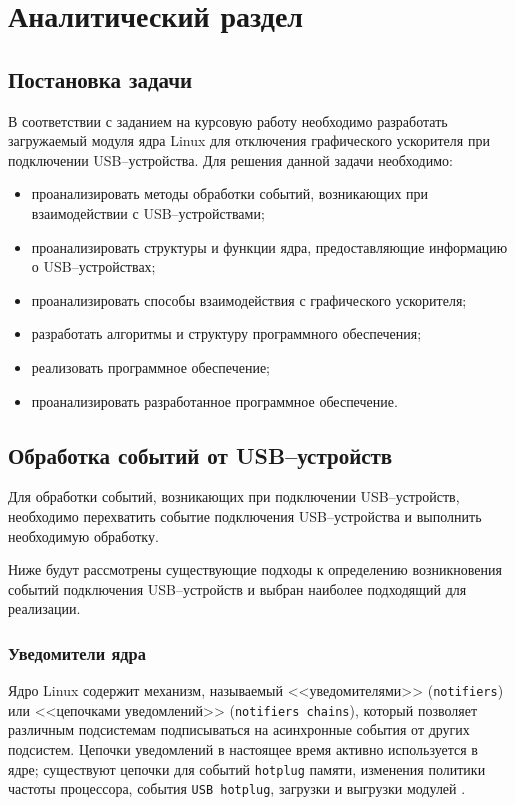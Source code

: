\chapter{Аналитический раздел}

\section{Постановка задачи}

В соответствии с заданием на курсовую работу необходимо разработать загружаемый модуля ядра Linux для отключения графического ускорителя при подключении USB--устройства. Для решения данной задачи необходимо:

\begin{itemize}
	\item проанализировать методы обработки событий, возникающих при взаимодействии с USB--устройствами;
	\item проанализировать структуры и функции ядра, предоставляющие информацию о USB--устройствах;
	\item проанализировать способы взаимодействия с графического ускорителя;
	\item разработать алгоритмы и структуру программного обеспечения;
	\item реализовать программное обеспечение;
	\item проанализировать разработанное программное обеспечение.
\end{itemize}

\section{Обработка событий от USB--устройств}

Для обработки событий, возникающих при подключении USB--устройств, необходимо перехватить событие подключения USB--устройства и выполнить необходимую обработку.

Ниже будут рассмотрены существующие подходы к определению возникновения событий подключения USB--устройств и выбран наиболее подходящий для реализации.

\newpage
\subsection{Уведомители ядра}

Ядро Linux содержит механизм, называемый <<уведомителями>> (\texttt{notifiers}) или <<цепочками уведомлений>> (\texttt{notifiers chains}), который позволяет различным подсистемам подписываться на асинхронные события от других подсистем. Цепочки уведомлений в настоящее время активно используется в ядре; существуют цепочки для событий \texttt{hotplug} памяти, изменения политики частоты процессора, события \texttt{USB hotplug}, загрузки и выгрузки модулей \cite{notifications}.

